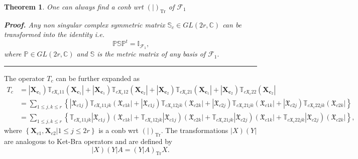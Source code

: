 \documentclass[aps, preprint]{revtex4}
\newtheorem{theorem}{Theorem}
\newenvironment{proof}[1][Proof]{\noindent\textbf{#1.} }{\ \rule{0.5em}{0.5em}}
\begin{document}
\begin{theorem}
One can always find a conb wrt $\left (\left .\text{}\right \vert \right )_{\ensuremath{\operatorname*{Tr}}}$ of $\mathcal{F}_{1}$ 


\begin{proof}
Any non singular complex symmetric matrix $\mathbb{S}_{c} \in G L \left (2 r ,\mathbb{C}\right )$ can be transformed into the identity i.e.
\begin{equation}\mathbb{P} \mathbb{S} \mathbb{P}^{t} =\mathbb{I}_{\mathcal{F}_{1}}\text{,}
\end{equation}where $\mathbb{P} \in G L \left (2 r ,\mathbb{C}\right )$ and $\mathbb{S}$ is the metric matrix of any basis of $\mathcal{F}_{1}\text{.}$ 
\end{proof}


\end{theorem}

The operator $T_{c}$ can be further expanded as
\begin{align}T_{c} &  =\left \vert \mathbf{X}_{\mathbf{c}}_{1}\right )\mathbb{T}_{c \mathfrak{X}_{c} 11} \left (\mathbf{X}_{\mathbf{c}}_{1}\right \vert  +\left \vert \mathbf{X}_{\mathbf{c}}_{1}\right ) \mathbb{T}_{c \mathfrak{X}_{c} 12} \left (\mathbf{X}_{\mathbf{c}}_{2}\right \vert  +\left \vert \mathbf{X}_{\mathbf{c}}_{2}\right ) \mathbb{T}_{c \mathfrak{X}_{c} 21} \left (\mathbf{X}_{\mathbf{c}}_{1}\right \vert  +\left \vert \mathbf{X}_{\mathbf{c}}_{2}\right ) \mathbb{T}_{c \mathfrak{X}_{c} 22}\left (\mathbf{X}_{\mathbf{c}}_{2}\right \vert  \\
 &  =\sum _{1 \leq j ,k \leq r}\left \{\left \vert \mathfrak{X}_{c 1 j}\right )\mathbb{T}_{c \mathfrak{X}_{c} 11 j k} \left (\mathfrak{X}_{c 1 k}\right \vert  +\left \vert \mathfrak{X}_{c 1 j}\right ) \mathbb{T}_{c \mathfrak{X}_{c} 12 j k} \left (\mathfrak{X}_{c 2 k}\right \vert  +\left \vert \mathfrak{X}_{c 2 j}\right ) \mathbb{T}_{c \mathfrak{X}_{c} 21 j k} \left (\mathfrak{X}_{c 1 k}\right \vert  +\left \vert \mathfrak{X}_{c 2 j}\right ) \mathbb{T}_{c \mathfrak{X}_{c} 22 j k}\left (\mathfrak{X}_{c 2 k}\right \vert \right \} \\
 &  =\sum _{1 \leq j ,k \leq r}\left \{\mathbb{T}_{c \mathfrak{X}_{c} 11 j k}\left \vert \mathfrak{X}_{c 1 j}\right )\left (\mathfrak{X}_{c 1 k}\right \vert  +\mathbb{T}_{c \mathfrak{X}_{c} 12 j k}\left \vert \mathfrak{X}_{c 1 j}\right )\left (\mathfrak{X}_{c 2 k}\right \vert  +\mathbb{T}_{c \mathfrak{X}_{c} 21 j k}\left \vert \mathfrak{X}_{c 2 j}\right )\left (\mathfrak{X}_{c 1 k}\right \vert  +\mathbb{T}_{c \mathfrak{X}_{c} 22 j k}\left \vert \mathfrak{X}_{c 2 j}\right )\left (\mathfrak{X}_{c 2 k}\right \vert \right \}\text{,}\end{align}where $\left \{\left .\mathbf{X}_{c 1} ,\mathbf{X}_{c 2}\right \vert 1 \leq j \leq 2 r\right \}$ is a conb wrt $\left (\left .\text{}\right \vert \right )_{\ensuremath{\operatorname*{Tr}}}\text{.}$ The transformations $\left \vert X\right )\left (Y\right \vert $ are analogous to Ket-Bra operators and are defined by
\begin{equation}\left \vert X\right )\left (Y\right \vert A =\left (\left .Y\right \vert A\right )_{\ensuremath{\operatorname*{Tr}}} X\text{.}
\end{equation}
\end{document}
